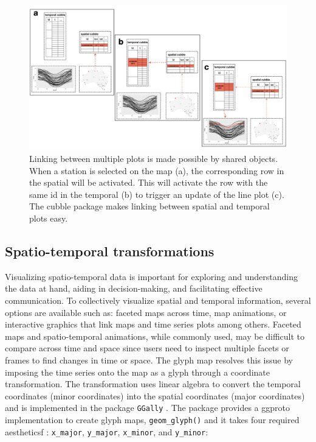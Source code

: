 \documentclass[
  shortnames]{jss}
\begin{document}
\begin{CodeChunk}
\begin{figure}

{\centering \includegraphics[width=1\linewidth,height=0.35\textheight]{figures/diagram-keynotes/‎diagram-keynotes.‎002} 

}

\caption{Linking between multiple plots is made possible by shared  objects. When a station is selected on the map (a), the corresponding row in the spatial  will be activated. This will activate the row with the same id in the temporal  (b) to trigger an update of the line plot (c). The cubble package makes linking between spatial and temporal plots easy.}\label{fig:illu-interactive}
\end{figure}
\end{CodeChunk}

\hypertarget{st_transformation}{%
\subsection{Spatio-temporal transformations}\label{st_transformation}}

Visualizing spatio-temporal data is important for exploring and understanding the data at hand, aiding in decision-making, and facilitating effective communication. To collectively visualize spatial and temporal information, several options are available such as: faceted maps across time, map animations, or interactive graphics that link maps and time series plots among others. Faceted maps and spatio-temporal animations, while commonly used, may be difficult to compare across time and space since users need to inspect multiple facets or frames to find changes in time or space. The glyph map \citep{Wickham2012-yr} resolves this issue by imposing the time series onto the map as a glyph through a coordinate transformation. The transformation uses linear algebra to convert the temporal coordinates (minor coordinates) into the spatial coordinates (major coordinates) and is implemented in the package \texttt{GGally} \citep{ggally}. The  package provides a ggproto implementation to create glyph maps, \texttt{geom\_glyph()} and it takes four required aestheticsf : \texttt{x\_major}, \texttt{y\_major}, \texttt{x\_minor}, and \texttt{y\_minor}:
\end{document}

